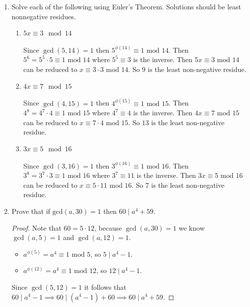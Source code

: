 \documentclass[class=article, crop=false]{standalone}
\begin{document}
\begin{enumerate}
\item
  Solve each of the following using Euler's Theorem.
  Solutions should be least nonnegative residues.
\begin{enumerate}
\item
  $5x\equiv 3\mod 14$\\\\
  Since $\gcd(5,14)=1$ then $5^{\phi(14)}\equiv 1\mbox{ mod }14$.
  Then $5^6 = 5^5 \cdot 5\equiv 1\mbox{ mod }14$ where $5^5\equiv 3$ is the inverse.
  Then $5x\equiv 3\mbox{ mod }14$ can be reduced to $x\equiv 3\cdot 3\mbox{ mod }14$.
  So $9$ is the least non-negative residue.
\item
  $4x\equiv 7\mod 15$\\\\
  Since $\gcd(4,15)=1$ then $4^{\phi(15)}\equiv 1\mbox{ mod }15$.
  Then $4^{8} = 4^7\cdot 4 \equiv 1\mbox{ mod }15$ where $4^7\equiv 4$ is the inverse.
  Then $4x\equiv 7\mbox{ mod }15$ can be reduced to $x\equiv 7\cdot 4\mbox{ mod }15$.
  So $13$ is the least non-negative residue.
\item
  $3x\equiv 5\mod 16$\\\\
  Since $\gcd(3,16)=1$ then $3^{\phi(16)}\equiv 1 \mbox{ mod }16$.
  Then $3^{8} = 3^7 \cdot 3 \equiv 1\mbox{ mod }16$ where $3^7 \equiv 11$ is the inverse.
  Then $3x\equiv 5\mbox{ mod }16$ can be reduced to $x\equiv 5\cdot 11\mbox{ mod }16$.
  So $7$ is the least non-negative residue.
\end{enumerate}

\item
  Prove that if $\text{gcd}(a,30)=1$ then $60\mid a^4+59$.
  \begin{proof}
	Note that $60 = 5\cdot 12$, because $\gcd(a,30)=1$ we know $\gcd(a,5)=1$ and $\gcd(a,12)=1$.
	\begin{itemize}
	  \item $a^{\phi(5)} = a^4 \equiv 1\mbox{ mod }5$, so $5\mid a^4-1$.

	  \item $a^{\phi(12)} = a^4 \equiv 1\mbox{ mod }12$, so $12\mid a^4-1$.
	\end{itemize}
	Since $\gcd(5,12)=1$ it follows that $60\mid a^4 -1 \implies 60\mid (a^4 -1)+60 \implies 60\mid a^4 +59$.
  \end{proof}

\end{enumerate}
\end{document}
